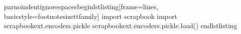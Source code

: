 \markdownRendererDocumentBegin
\markdownRendererBackslash{}par\markdownRendererBackslash{}noindent\markdownRendererBackslash{}ignorespaces\markdownRendererBackslash{}begin\markdownRendererLeftBrace{}lstlisting\markdownRendererRightBrace{}[frame=lines, basicstyle=\markdownRendererBackslash{}footnotesize\markdownRendererBackslash{}ttfamily] import scrapbook import scrapbook\markdownRendererUnderscore{}ext.encoders.pickle\markdownRendererInterblockSeparator
{}scrapbook\markdownRendererUnderscore{}ext.encoders.pickle.load() \markdownRendererBackslash{}end\markdownRendererLeftBrace{}lstlisting\markdownRendererRightBrace{}\markdownRendererDocumentEnd